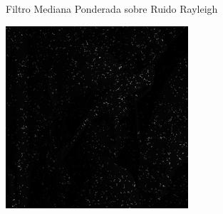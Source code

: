 \documentclass{beamer}
\begin{document}
\begin{frame}[fragile]{Filtro Mediana Ponderada sobre Ruido Rayleigh}
\begin{minipage}{0.25\linewidth}
	\end{minipage}\hfill
	\begin{minipage}{0.25\linewidth}
		\centering
		\includegraphics[width=\linewidth]{../results/lena_rayleigh_xi10_mediana_ponderada}
	\end{minipage}
\end{frame}
\end{document}
